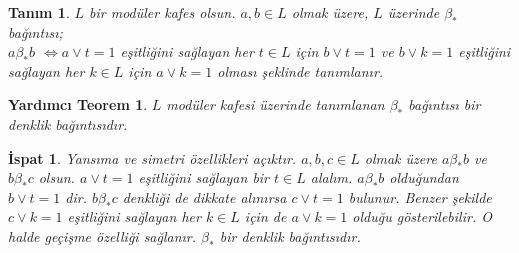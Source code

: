 \documentclass[a4paper,12pt]{article}
\numberwithin{equation}{section}
\theoremstyle{italik}
\newtheorem{lemma}[teorem]{Yardımcı Teorem}
\newtheorem{tanim}[teorem]{Tanım}
\newtheorem*{ispat}{İspat}
\begin{document}
\begin{tanim} \label{1}
$ L $ bir modüler kafes olsun. $ a,b \in L $ olmak üzere, $ L $ üzerinde $ \beta_* $ bağıntısı;
\\ $ a \beta_* b $
$ \Leftrightarrow a \vee t = 1 $ eşitliğini sağlayan her $ t \in L $ için $ b \vee t = 1 $ ve 
$ b \vee k = 1 $ eşitliğini sağlayan her $ k \in L $ için $ a \vee k = 1 $ olması şeklinde tanımlanır.
\end{tanim}


\begin{lemma} \label{2}
$ L $ modüler kafesi üzerinde tanımlanan $ \beta_* $ bağıntısı bir denklik bağıntısıdır.
\end{lemma}
\begin{ispat}
Yansıma ve simetri özellikleri açıktır. $ a,b,c \in L $ olmak üzere $ a \beta_*b $ ve $ b \beta_* c $ olsun. 
$ a \vee t = 1 $ eşitliğini sağlayan bir $ t \in L $ alalım. $ a \beta_* b $ olduğundan $ b \vee t = 1 $ dir. $ b \beta_* c $ denkliği de dikkate 
alınırsa $ c \vee t = 1 $ bulunur. Benzer şekilde $ c \vee k = 1 $ eşitliğini sağlayan her $ k \in L $ için de $ a \vee k = 1 $ olduğu 
gösterilebilir. O halde geçişme özelliği sağlanır. $ \beta_* $ bir denklik bağıntısıdır.
\end{ispat}

\end{document}
